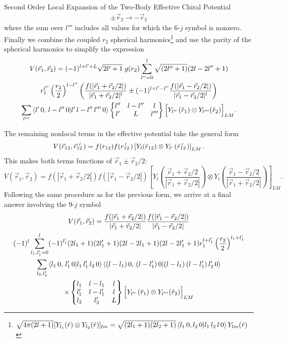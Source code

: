 \begin{section}{Second Order Local Expansion of the Two-Body Effective Chiral Potential\label{sec:localChiral}}
\begin{multline}
\pm \vec{r}_2 \rightarrow -\vec{r}_2
\end{multline}
where the sum over $l'''$ includes all values for which the 6-$j$ symbol is nonzero. Finally we combine the coupled $r_2$ spherical harmonics\footnote{$\sqrt{4\pi(2l+1)}[Y_{l_1}(\hat{r})\otimes Y_{l_2}(\hat{r})]_{lm}=\sqrt{(2l_1+1)(2l_2+1)}\braket{l_1\,0,l_2\,0|l_1\,l_2\,l\,0}Y_{lm}(\hat{r})$} and use the parity of the spherical harmonics to simplify the expression 
\begin{multline}\label{eq:fgRecoupled}
V(\vec{r}_1,\vec{r}_2)=(-1)^{l+l'+L}\sqrt{2l'+1}\;g(r_2) \sum_{l''=0}^{l} \sqrt{(2l''+1)}(2l-2l''+1)  \\
  r_1^{l''} \left(\frac{r_2}{2}\right)^{l-l''} \left(\frac{f(|\vec{r}_1+\vec{r}_2/2|)}{|\vec{r}_1+\vec{r}_2/2|^{l} } \pm (-1)^{l+l'-l''} \frac{f(|\vec{r}_1-\vec{r}_2/2|)}{|\vec{r}_1-\vec{r}_2/2|^{l} }\right) \\
\sum_{l'''} \braket{l'\,0,\,l-l''\,0 | l'\,l-l''\,l'''\,0} \begin{Bmatrix} l'' & l-l'' & l \\ l' & L & l''' \end{Bmatrix} \Big[Y_{l''}\left(\hat{r}_1\right) \otimes Y_{l'''}(\hat{r}_2) \Big]_{L M} .
\end{multline}

The remaining nonlocal terms in the effective potential take the general form
\begin{equation}
V(\rot,\rotp)=f(r_{12})f(\rotpr) \left[Y_{l}(\hat{r}_{12})\otimes Y_{l'}\left(\rotphat \right)\right]_{L M}.
\end{equation}
This makes both terms functions of $\vec{r}_1\pm\vec{r}_2/2$:
\begin{equation}\label{eq:r1r2Form1}
V(\vec{r}_1,\vec{r}_2)=f(|\vec{r}_1+\vec{r}_2/2|)f(|\vec{r}_1-\vec{r}_2/2|) \left[Y_{l}\left(\frac{\vec{r}_1+\vec{r}_2/2}{|\vec{r}_1+\vec{r}_2/2|}\right)\otimes Y_{l}\left(\frac{\vec{r}_1-\vec{r}_2/2}{|\vec{r}_1+\vec{r}_2/2|}\right) \right]_{L M}.
\end{equation} 
Following the same procedure as for the previous form, we arrive at a final answer involving the 9-$j$ symbol
\begin{multline}\label{eq:ffRecoupled}
V(\vec{r}_1,\vec{r}_2)=\frac{f(|\vec{r}_1+\vec{r}_2/2|)}{|\vec{r}_1+\vec{r}_2/2|}\frac{f(|\vec{r}_1-\vec{r}_2/2|)}{|\vec{r}_1-\vec{r}_2/2|} \\
(-1)^{l} \sum_{l_1,l'_1=0}^{l} (-1)^{l'_1}(2l_1+1)(2l'_1+1)(2l-2l_1+1)(2l-2l'_1+1) r_1^{l+l'_1} \left(\frac{r_2}{2}\right)^{l_1+l'_1}  \\
\sum_{l_2,l'_2} \braket{l_1\,0,\,l'_1\,0 | l_1\,l'_1\,l_2\,0}\braket{(l-l_1)\,0,\,(l-l'_1)\,0 | (l-l_1)\,(l-l'_1)\,l'_2\,0} \\
\times\begin{Bmatrix} l_1 & l-l_1 & l \\ l'_1 & l-l'_1 & l \\ l_2 & l'_2 & L \end{Bmatrix} \Big[Y_{l''}\left(\hat{r}_1\right) \otimes Y_{l'''}(\hat{r}_2) \Big]_{L M} 
\end{multline}


\end{section}

